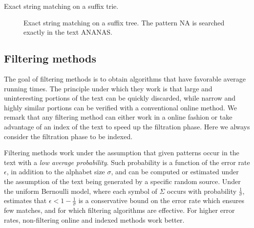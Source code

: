 \begin{algorithm}[h]
\caption{Exact string matching on a suffix trie.}
\label{alg:st-exact}
\begin{algorithmic}[1]
		\State \Report {}
			\State {}
	\EndIf
\EndProcedure
\end{algorithmic}
\end{algorithm}

\begin{figure}[h]
\begin{center}
\caption[Exact string matching on a suffix tree.]{Exact string matching on a suffix tree. The pattern NA is searched exactly in the text ANANAS.}
\label{fig:st-exact}

\end{center}
\end{figure}



\subsection{Filtering methods}
\label{sec:intro:filtering}

The goal of filtering methods is to obtain algorithms that have favorable average running times.
The principle under which they work is that large and uninteresting portions of the text can be quickly discarded, while narrow and highly similar portions can be verified with a conventional online method.
We remark that any filtering method can either work in a online fashion or take advantage of an index of the text to speed up the filtration phase.
Here we always consider the filtration phase to be indexed.

Filtering methods work under the assumption that given patterns occur in the text with a \emph{low average probability}.
Such probability is a function of the error rate $\epsilon$, in addition to the alphabet size $\sigma$, and can be computed or estimated under the assumption of the text being generated by a specific random source.
Under the uniform Bernoulli model, where each symbol of $\Sigma$ occurs with probability $\frac{1}{\sigma}$, \citet{Navarro2000} estimates that $\epsilon < 1 - \frac{1}{\sigma}$ is a conservative bound on the error rate which ensures few matches, and for which filtering algorithms are effective.
For higher error rates, non-filtering online and indexed methods work better.

